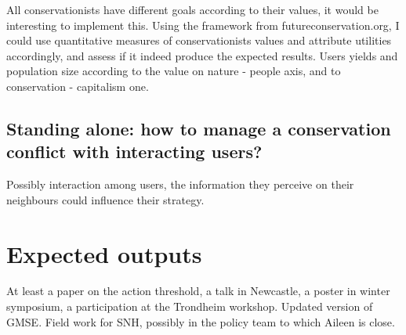 \documentclass[12pt,a4paper]{article}
\begin{document}
All conservationists have different goals according to their values, it would be interesting to implement this. Using the framework from futureconservation.org, I could use quantitative measures of conservationists values and attribute utilities accordingly, and assess if it indeed produce the expected results. Users yields and population size according to the value on nature - people axis, and to conservation - capitalism one. 

\subsection{Standing alone: how to manage a conservation conflict with interacting users?}

Possibly interaction among users, the information they perceive on their neighbours could influence their strategy.

\section{Expected outputs}

At least a paper on the action threshold, a talk in Newcastle, a poster in winter symposium, a participation at the Trondheim workshop. Updated version of GMSE. Field work for SNH, possibly in the policy team to which Aileen is close.
\end{document}
